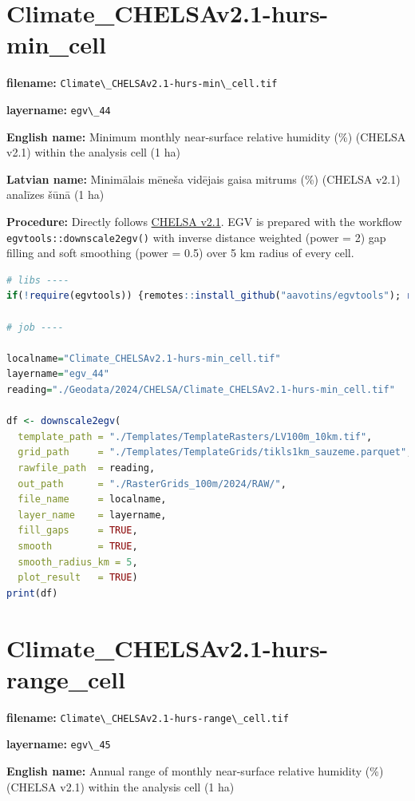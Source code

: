 \documentclass[
]{book}
\newcommand{\passthrough}[1]{#1}
\begin{document}
\section{Climate\_CHELSAv2.1-hurs-min\_cell}\label{ch06.044}

\textbf{filename:} \passthrough{\lstinline!Climate\_CHELSAv2.1-hurs-min\_cell.tif!}

\textbf{layername:} \passthrough{\lstinline!egv\_44!}

\textbf{English name:} Minimum monthly near-surface relative humidity (\%) (CHELSA v2.1) within the analysis cell (1 ha)

\textbf{Latvian name:} Minimālais mēneša vidējais gaisa mitrums (\%) (CHELSA v2.1) analīzes šūnā (1 ha)

\textbf{Procedure:} Directly follows \hyperref[Ch04.11]{CHELSA v2.1}. EGV is prepared with the
workflow \passthrough{\lstinline!egvtools::downscale2egv()!} with inverse distance weighted (power = 2)
gap filling and soft smoothing (power = 0.5) over 5 km radius of every cell.

\begin{lstlisting}[language=R]
# libs ----
if(!require(egvtools)) {remotes::install_github("aavotins/egvtools"); require(egvtools)}

# job ----

localname="Climate_CHELSAv2.1-hurs-min_cell.tif"
layername="egv_44"
reading="./Geodata/2024/CHELSA/Climate_CHELSAv2.1-hurs-min_cell.tif"

df <- downscale2egv(
  template_path = "./Templates/TemplateRasters/LV100m_10km.tif",
  grid_path     = "./Templates/TemplateGrids/tikls1km_sauzeme.parquet",
  rawfile_path  = reading,
  out_path      = "./RasterGrids_100m/2024/RAW/",
  file_name     = localname,
  layer_name    = layername,
  fill_gaps     = TRUE,
  smooth        = TRUE,
  smooth_radius_km = 5,
  plot_result   = TRUE)
print(df)
\end{lstlisting}

\section{Climate\_CHELSAv2.1-hurs-range\_cell}\label{ch06.045}

\textbf{filename:} \passthrough{\lstinline!Climate\_CHELSAv2.1-hurs-range\_cell.tif!}

\textbf{layername:} \passthrough{\lstinline!egv\_45!}

\textbf{English name:} Annual range of monthly near-surface relative humidity (\%) (CHELSA v2.1) within the analysis cell (1 ha)
\end{document}
